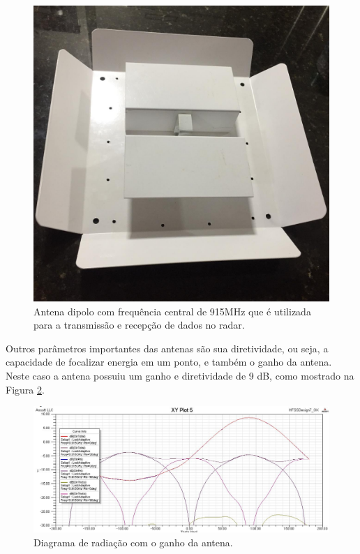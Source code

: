 \begin{figure}[H]
    \centering
   \includegraphics[scale = 0.15]{figuras/antena.jpeg}
   \caption{Antena dipolo com frequência central de 915MHz que é utilizada para a transmissão e recepção de dados no radar.}
   \label{antena}
    \end{figure}

Outros parâmetros importantes das antenas são sua diretividade, ou seja, a capacidade de focalizar energia em um ponto, e também o ganho da antena. Neste caso a antena possuiu um ganho e diretividade de 9 dB, como mostrado na Figura \ref{ganho}. 

\begin{figure}[H]
    \centering
   \includegraphics[scale = 0.45]{figuras/ganho.png}
   \caption{Diagrama de radiação com o ganho da antena.}
   \label{ganho}
    \end{figure}

